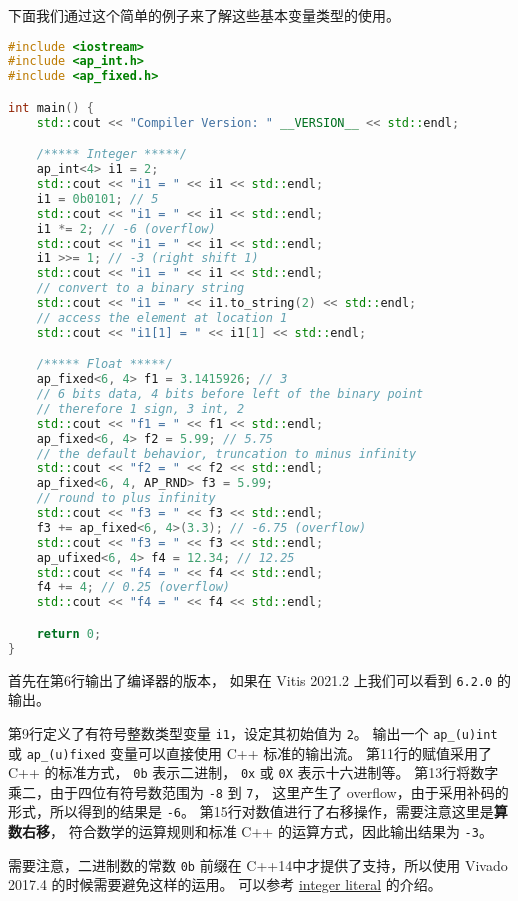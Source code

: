 \documentclass[Chinese,TC,use boldface,simple Names]{beaulivre}
\begin{document}
      下面我们通过这个简单的例子来了解这些基本变量类型的使用。
      \begin{lstlisting}[language=C++,morekeywords={ap\_int,ap\_fixed,ap\_ufixed,std,cout,endl,to\_string}]
#include <iostream>
#include <ap_int.h>
#include <ap_fixed.h>

int main() {
    std::cout << "Compiler Version: " __VERSION__ << std::endl;

    /***** Integer *****/
    ap_int<4> i1 = 2;
    std::cout << "i1 = " << i1 << std::endl;
    i1 = 0b0101; // 5
    std::cout << "i1 = " << i1 << std::endl;
    i1 *= 2; // -6 (overflow)
    std::cout << "i1 = " << i1 << std::endl;
    i1 >>= 1; // -3 (right shift 1)
    std::cout << "i1 = " << i1 << std::endl;
    // convert to a binary string
    std::cout << "i1 = " << i1.to_string(2) << std::endl;
    // access the element at location 1
    std::cout << "i1[1] = " << i1[1] << std::endl;

    /***** Float *****/
    ap_fixed<6, 4> f1 = 3.1415926; // 3
    // 6 bits data, 4 bits before left of the binary point
    // therefore 1 sign, 3 int, 2
    std::cout << "f1 = " << f1 << std::endl;
    ap_fixed<6, 4> f2 = 5.99; // 5.75
    // the default behavior, truncation to minus infinity
    std::cout << "f2 = " << f2 << std::endl;
    ap_fixed<6, 4, AP_RND> f3 = 5.99;
    // round to plus infinity
    std::cout << "f3 = " << f3 << std::endl;
    f3 += ap_fixed<6, 4>(3.3); // -6.75 (overflow)
    std::cout << "f3 = " << f3 << std::endl;
    ap_ufixed<6, 4> f4 = 12.34; // 12.25
    std::cout << "f4 = " << f4 << std::endl;
    f4 += 4; // 0.25 (overflow)
    std::cout << "f4 = " << f4 << std::endl;

    return 0;
}
      \end{lstlisting}
      首先在第6行输出了编译器的版本，
      如果在 Vitis 2021.2 上我们可以看到 \texttt{6.2.0} 的输出。

      第9行定义了有符号整数类型变量 \texttt{i1}，设定其初始值为 \texttt{2}。
      输出一个 \texttt{ap\_(u)int} 或 \texttt{ap\_(u)fixed} 变量可以直接使用 C++ 标准的输出流。
      第11行的赋值采用了 C++ 的标准方式，
      \texttt{0b} 表示二进制，
      \texttt{0x} 或 \texttt{0X} 表示十六进制等。
      第13行将数字乘二，由于四位有符号数范围为 \texttt{-8} 到 \texttt{7}，
      这里产生了 overflow，由于采用补码的形式，所以得到的结果是 \texttt{-6}。
      第15行对数值进行了右移操作，需要注意这里是\textbf{算数右移}，
      符合数学的运算规则和标准 C++ 的运算方式，因此输出结果为 \texttt{-3}。
      \begin{tip}[C++常数前缀]
        需要注意，二进制数的常数 \texttt{0b} 前缀在 C++14中才提供了支持，所以使用 Vivado 2017.4 的时候需要避免这样的运用。
        可以参考 \href{https://en.cppreference.com/w/cpp/language/integer_literal}{integer literal} 的介绍。
      \end{tip}
\end{document}
